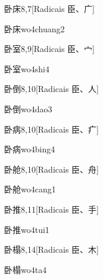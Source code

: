 \begin{entry}{卧床}{8,7}[Radicais ⾂、⼴]
  \begin{phonetics}{卧床}{wo4chuang2}
  \end{phonetics}
\end{entry}

\begin{entry}{卧室}{8,9}[Radicais ⾂、⼧]
  \begin{phonetics}{卧室}{wo4shi4}
  \end{phonetics}
\end{entry}

\begin{entry}{卧倒}{8,10}[Radicais ⾂、⼈]
  \begin{phonetics}{卧倒}{wo4dao3}
  \end{phonetics}
\end{entry}

\begin{entry}{卧病}{8,10}[Radicais ⾂、⽧]
  \begin{phonetics}{卧病}{wo4bing4}
  \end{phonetics}
\end{entry}

\begin{entry}{卧舱}{8,10}[Radicais ⾂、⾈]
  \begin{phonetics}{卧舱}{wo4cang1}
  \end{phonetics}
\end{entry}

\begin{entry}{卧推}{8,11}[Radicais ⾂、⼿]
  \begin{phonetics}{卧推}{wo4tui1}
  \end{phonetics}
\end{entry}

\begin{entry}{卧榻}{8,14}[Radicais ⾂、⽊]
  \begin{phonetics}{卧榻}{wo4ta4}
  \end{phonetics}
\end{entry}


